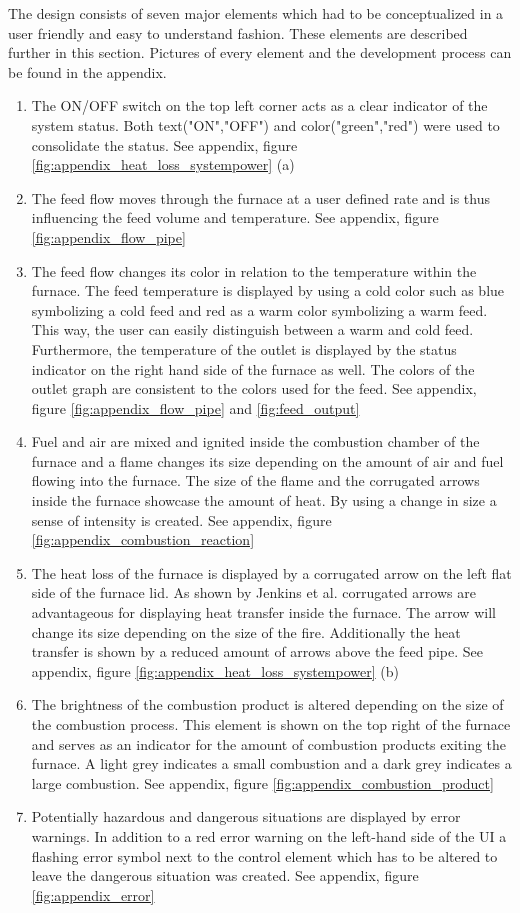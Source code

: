The design consists of seven major elements which had to be conceptualized in a user friendly and easy to understand fashion. These elements are described further in this section. Pictures of every element and the development process can be found in the appendix.

\begin{enumerate}
  \item The ON/OFF switch on the top left corner acts as a clear indicator of the system status. Both text("ON","OFF") and color("green","red") were used to consolidate the status. See appendix, figure \ref{fig:appendix_heat_loss_systempower} (a)
  \item The feed flow moves through the furnace at a user defined rate and is thus influencing the feed volume and temperature. See appendix, figure \ref{fig:appendix_flow_pipe}
  \item The feed flow changes its color in relation to the temperature within the furnace. The feed temperature is displayed by using a cold color such as blue symbolizing a cold feed and red as a warm color symbolizing a warm feed. This way, the user can easily distinguish between a warm and cold feed. Furthermore, the temperature of the outlet is displayed by the status indicator on the right hand side of the furnace as well. The colors of the outlet graph are consistent to the colors used for the feed. See appendix, figure \ref{fig:appendix_flow_pipe} and \ref{fig:feed_output}
  \item Fuel and air are mixed and ignited inside the combustion chamber of the furnace and a flame changes its size depending on the amount of air and fuel flowing into the furnace. The size of the flame and the corrugated arrows inside the furnace showcase the amount of heat. By using a change in size a sense of intensity is created. See appendix, figure \ref{fig:appendix_combustion_reaction}
  \item The heat loss of the furnace is displayed by a corrugated arrow on the left flat side of the furnace lid. As shown by Jenkins et al.  \cite{Jenkins2013} corrugated arrows are advantageous for displaying heat transfer inside the furnace. The arrow will change its size depending on the size of the fire. Additionally the heat transfer is shown by a reduced amount of arrows above the feed pipe.  See appendix, figure \ref{fig:appendix_heat_loss_systempower} (b)
  \item The brightness of the combustion product is altered depending on the size of the combustion process. This element is shown on the top right of the furnace and serves as an indicator for the amount of combustion products exiting the furnace. A light grey indicates a small combustion and a dark grey indicates a large combustion. See appendix, figure \ref{fig:appendix_combustion_product}
  \item Potentially hazardous and dangerous situations are displayed by error warnings. In addition to a red error warning on the left-hand side of the \ac{UI} a flashing error symbol next to the control element which has to be altered to leave the dangerous situation was created.  See appendix, figure \ref{fig:appendix_error}
\end{enumerate}

